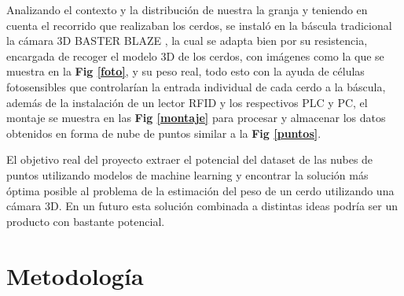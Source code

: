 \documentclass[12pt,a4paper]{article}
\begin{document}
Analizando el contexto y la distribución de nuestra la granja y teniendo en cuenta el recorrido que realizaban los cerdos, se instaló en la báscula tradicional la cámara 3D BASTER BLAZE \cite{camara}, la cual se adapta bien por su resistencia, encargada de recoger el modelo 3D de los cerdos, con imágenes como la que se muestra en la \textbf{Fig \ref{foto}}, y su peso real, todo esto con la ayuda de células fotosensibles que controlarían la entrada individual de cada cerdo a la báscula, además de la instalación de un lector RFID y los respectivos PLC y PC, el montaje se muestra en las \textbf{Fig \ref{montaje}} para procesar y almacenar los datos obtenidos en forma de nube de puntos similar a la \textbf{Fig \ref{puntos}}.


El objetivo real del proyecto extraer el potencial del dataset de las nubes de puntos utilizando modelos de machine learning y encontrar la solución más óptima posible al problema de la estimación del peso de un cerdo utilizando una cámara 3D. En un futuro esta solución combinada a distintas ideas podría ser un producto con bastante potencial.




\section{Metodología}
\end{document}
